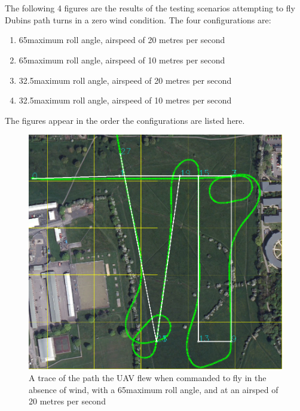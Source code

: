 \chapter{} 
\label{app:NoWindMaps}

\graphicspath{{Appendix5/Figs/}}

\renewcommand{\thefigure}{E\arabic{figure}}

\setcounter{figure}{0}

The following 4 figures are the results of the testing scenarios attempting to fly Dubins path turns in a zero wind condition. The four configurations are:

\begin{enumerate}
	\item 65\degree  maximum roll angle, airspeed of 20 metres per second
	\item 65\degree  maximum roll angle, airspeed of 10 metres per second
	\item 32.5\degree  maximum roll angle, airspeed of 20 metres per second
	\item 32.5\degree  maximum roll angle, airspeed of 10 metres per second
\end{enumerate}

The figures appear in the order the configurations are listed here.


\begin{figure}[htbp!] 
\centering    
\includegraphics[width=\textwidth]{65_20_NoWind}
\caption{A trace of the path the UAV flew when commanded to fly in the absence of wind, with a 65\degree  maximum roll angle, and at an airsped of 20 metres per second}
\end{figure}

